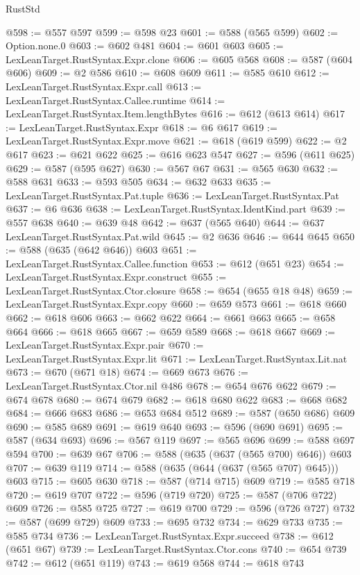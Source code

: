 \begin{lexlean}{RustStd}
\begin{coremodule}
@598 := @557 @597
@599 := @598 @23
@601 := @588 (@565 @599)
@602 := Option.none.{0}
@603 := @602 @481
@604 := @601 @603
@605 := LexLeanTarget.RustSyntax.Expr.clone
@606 := @605 @568
@608 := @587 (@604 @606)
@609 := @2 @586
@610 := @608 @609
@611 := @585 @610
@612 := LexLeanTarget.RustSyntax.Expr.call
@613 := LexLeanTarget.RustSyntax.Callee.runtime
@614 := LexLeanTarget.RustSyntax.Item.lengthBytes
@616 := @612 (@613 @614)
@617 := LexLeanTarget.RustSyntax.Expr
@618 := @6 @617
@619 := LexLeanTarget.RustSyntax.Expr.move
@621 := @618 (@619 @599)
@622 := @2 @617
@623 := @621 @622
@625 := @616 @623 @547
@627 := @596 (@611 @625)
@629 := @587 (@595 @627)
@630 := @567 @67
@631 := @565 @630
@632 := @588 @631
@633 := @593 @505
@634 := @632 @633
@635 := LexLeanTarget.RustSyntax.Pat.tuple
@636 := LexLeanTarget.RustSyntax.Pat
@637 := @6 @636
@638 := LexLeanTarget.RustSyntax.IdentKind.part
@639 := @557 @638
@640 := @639 @48
@642 := @637 (@565 @640)
@644 := @637 LexLeanTarget.RustSyntax.Pat.wild
@645 := @2 @636
@646 := @644 @645
@650 := @588 (@635 (@642 @646)) @603
@651 := LexLeanTarget.RustSyntax.Callee.function
@653 := @612 (@651 @23)
@654 := LexLeanTarget.RustSyntax.Expr.construct
@655 := LexLeanTarget.RustSyntax.Ctor.closure
@658 := @654 (@655 @18 @48)
@659 := LexLeanTarget.RustSyntax.Expr.copy
@660 := @659 @573
@661 := @618 @660
@662 := @618 @606
@663 := @662 @622
@664 := @661 @663
@665 := @658 @664
@666 := @618 @665
@667 := @659 @589
@668 := @618 @667
@669 := LexLeanTarget.RustSyntax.Expr.pair
@670 := LexLeanTarget.RustSyntax.Expr.lit
@671 := LexLeanTarget.RustSyntax.Lit.nat
@673 := @670 (@671 @18)
@674 := @669 @673
@676 := LexLeanTarget.RustSyntax.Ctor.nil @486
@678 := @654 @676 @622
@679 := @674 @678
@680 := @674 @679
@682 := @618 @680 @622
@683 := @668 @682
@684 := @666 @683
@686 := @653 @684 @512
@689 := @587 (@650 @686) @609
@690 := @585 @689
@691 := @619 @640
@693 := @596 (@690 @691)
@695 := @587 (@634 @693)
@696 := @567 @119
@697 := @565 @696
@699 := @588 @697 @594
@700 := @639 @67
@706 := @588 (@635 (@637 (@565 @700) @646)) @603
@707 := @639 @119
@714 := @588 (@635 (@644 (@637 (@565 @707) @645))) @603
@715 := @605 @630
@718 := @587 (@714 @715) @609
@719 := @585 @718
@720 := @619 @707
@722 := @596 (@719 @720)
@725 := @587 (@706 @722) @609
@726 := @585 @725
@727 := @619 @700
@729 := @596 (@726 @727)
@732 := @587 (@699 @729) @609
@733 := @695 @732
@734 := @629 @733
@735 := @585 @734
@736 := LexLeanTarget.RustSyntax.Expr.succeed
@738 := @612 (@651 @67)
@739 := LexLeanTarget.RustSyntax.Ctor.cons
@740 := @654 @739
@742 := @612 (@651 @119)
@743 := @619 @568
@744 := @618 @743

\end{coremodule}
\end{lexlean}
